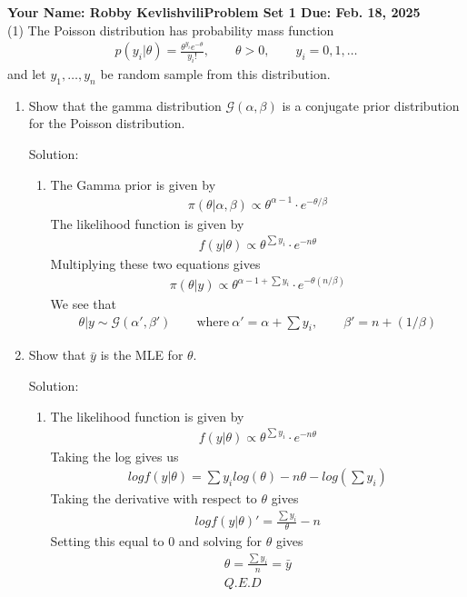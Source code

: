 \documentclass[final,11pt]{article}
\begin{document}
\thispagestyle{empty}
\begin{spacing}{1.25}

\textbf{Your Name: Robby Kevlishvili\hfill Problem Set 1 Due: Feb. 18, 2025}\\

(1) The Poisson distribution has probability mass function
\begin{gather}
    p(y_i|\theta)=\frac{\theta^{y_i}e^{-\theta}}{y_i!},\qquad \theta>0,\qquad y_i=0,1,\ldots
\end{gather}
and let $y_1,\ldots,y_n$ be random sample from this distribution.
\begin{enumerate}
    \item Show that the gamma distribution $\mathcal{G}(\alpha,\beta)$ is a conjugate prior distribution for the Poisson distribution.

{\color{blue}
Solution:
\begin{enumerate}
    \item The Gamma prior is given by
    \begin{gather}
        \pi(\theta|\alpha,\beta)\propto \theta^{\alpha-1}\cdot e^{-\theta/\beta}
    \end{gather}
    The likelihood function is given by
    \begin{gather}
        f(y|\theta)\propto \theta^{\sum y_i}\cdot e^{-n\theta}
    \end{gather}
    Multiplying these two equations gives
    \begin{gather}
        \pi(\theta|y) \propto \theta^{\alpha-1+\sum y_i} \cdot e^{-\theta(n/\beta)}
    \end{gather}
    We see that 
    \begin{gather}
        \theta|y \sim \mathcal{G}(\alpha',\beta') \qquad \text{where}\ \alpha' = \alpha + \sum y_i, \qquad \beta' = n+(1/\beta)  
    \end{gather}
\end{enumerate}
}

  
    \item Show that $\bar{y}$ is the MLE for $\theta$.

{\color{red}
Solution:
\begin{enumerate}
    \item The likelihood function is given by
    \begin{gather}
        f(y|\theta)\propto \theta^{\sum y_i}\cdot e^{-n\theta}
    \end{gather}
    Taking the log gives us
    \begin{gather}
        log f(y|\theta) = \sum y_i log(\theta) -n\theta-log(\sum y_i)
    \end{gather}
    Taking the derivative with respect to $\theta$ gives
    \begin{gather}
         log f(y|\theta)' =  \frac{\sum y_i}{\theta} -n
    \end{gather}
    Setting this equal to 0 and solving for $\theta$ gives
    \begin{gather}
        \theta = \frac{\sum y_i}{n}= \bar{y}\\  
        Q.E.D
    \end{gather}
\end{enumerate}

}
\end{enumerate}
\end{spacing}
\end{document}
